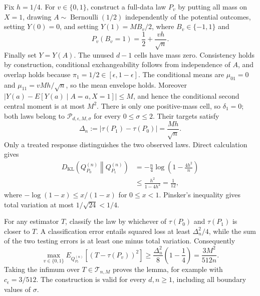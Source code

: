 Fix \(h=1/4\).  For \(v\in\{0,1\}\), construct a full-data law \(P_v\) by putting all mass on \(X=1\), drawing \(A\sim\operatorname{Bernoulli}(1/2)\) independently of the potential outcomes, setting \(Y(0)=0\), and setting \(Y(1)=MB_v/2\), where \(B_v\in\{-1,1\}\) and
\[
 P_v(B_v=1)=\frac12+\frac{vh}{\sqrt n}.
\tag{1}
\]
Finally set \(Y=Y(A)\).  The unused \(d-1\) cells have mass zero.  Consistency holds by construction, conditional exchangeability follows from independence of \(A\), and overlap holds because \(\pi_1=1/2\in[\epsilon,1-\epsilon]\).  The conditional means are \(\mu_{01}=0\) and \(\mu_{11}=vMh/\sqrt n\), so the mean envelope holds.  Moreover \(|Y(a)-E[Y(a)\mid A=a,X=1]|\le M\), and hence the conditional second central moment is at most \(M^2\).  There is only one positive-mass cell, so \(\delta_1=0\); both laws belong to \(\mathcal P_{d,\epsilon,M,\sigma}\) for every \(0\le\sigma\le2\).  Their targets satisfy
\[
 \Delta_n:=|\tau(P_1)-\tau(P_0)|=\frac{Mh}{\sqrt n}.
\tag{2}
\]
Only a treated response distinguishes the two observed laws.  Direct calculation gives
\[
\begin{aligned}
 D_{\mathrm{KL}}\!\left(Q_{P_0}^{(n)}\middle\|Q_{P_1}^{(n)}\right)
 &=-\frac n4\log\left(1-\frac{4h^2}{n}\right)\\
 &\le \frac{h^2}{1-4h^2}=\frac1{12},
\end{aligned}
\tag{3}
\]
where \(-\log(1-x)\le x/(1-x)\) for \(0\le x<1\).  Pinsker's inequality gives total variation at most \(1/\sqrt{24}<1/4\).

For any estimator \(T\), classify the law by whichever of \(\tau(P_0)\) and \(\tau(P_1)\) is closer to \(T\).  A classification error entails squared loss at least \(\Delta_n^2/4\), while the sum of the two testing errors is at least one minus total variation.  Consequently
\[
 \max_{v\in\{0,1\}}E_{Q_{P_v}^{(n)}}[(T-\tau(P_v))^2]
 \ge \frac{\Delta_n^2}{8}\left(1-\frac14\right)
 =\frac{3M^2}{512n}.
\tag{4}
\]
Taking the infimum over \(T\in\mathcal T_{n,M}\) proves the lemma, for example with \(c_{\epsilon}=3/512\).  The construction is valid for every \(d,n\ge1\), including all boundary values of \(\sigma\).